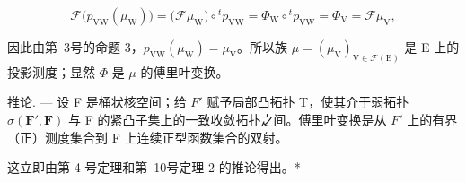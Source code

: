 \[
\mathcal {F} \big (p _ {\mathrm{VW}} (\mu_ {\mathrm{W}}) \big) = \big (\mathcal {F} \mu_ {\mathrm{W}} \big) \circ {} ^ {t} p _ {\mathrm{VW}} = \Phi_ {\mathrm{W}} \circ {} ^ {t} p _ {\mathrm{VW}} = \Phi_ {\mathrm{V}} = \mathcal {F} \mu_ {\mathrm{V}},
\]

因此由第~3号的命题 3，\(p_{\mathrm{VW}}(\mu_{\mathrm{W}}) = \mu_{\mathrm{V}}\)。所以族 \(\mu = (\mu_{\mathrm{V}})_{\mathrm{V} \in \mathcal{F}(\mathrm{E})}\) 是 E 上的投影测度；显然 \(\Phi\) 是 \(\mu\) 的傅里叶变换。

推论. --- 设 F 是桶状核空间；给 \(F'\) 赋予局部凸拓扑 T，使其介于弱拓扑 \(\sigma(\mathbf{F}',\mathbf{F})\) 与 F 的紧凸子集上的一致收敛拓扑之间。傅里叶变换是从 \(F'\) 上的有界（正）测度集合到 F 上连续正型函数集合的双射。

这立即由第 4 号定理和第~10号定理 2 的推论得出。*

